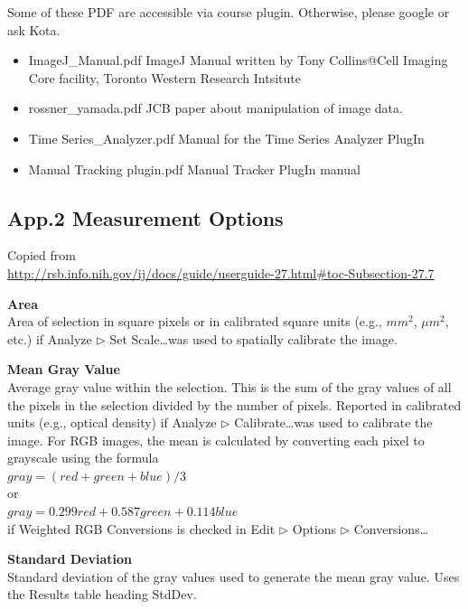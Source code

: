 Some of these PDF are accessible via course plugin. Otherwise, please google or ask Kota. 
\begin{itemize}
\item ImageJ\_Manual.pdf 
\subitem ImageJ Manual written by Tony Collins@Cell Imaging Core facility,
Toronto Western Research Intsitute

\item rossner\_yamada.pdf
\subitem JCB paper about manipulation of image data.

\item Time Series\_Analyzer.pdf
\subitem Manual for the Time Series Analyzer PlugIn 

\item Manual Tracking plugin.pdf
\subitem Manual Tracker PlugIn manual
\end{itemize}


\clearpage
\subsection{App.2 Measurement Options}
\label{app2}
Copied from\\
\url{http://rsb.info.nih.gov/ij/docs/guide/userguide-27.html\#toc-Subsection-27.7}

\textbf{Area}\\Area of selection in square pixels or in calibrated
square units (e.g., $mm^2$, $\mu m^{2}$, etc.) if Analyze
${\triangleright}$ Set Scale\ldots was used to spatially calibrate the
image.

\textbf{Mean Gray Value}\\Average gray value within the selection.
This is the sum of the gray values of all the pixels in the selection
divided by the number of pixels. Reported in calibrated units (e.g.,
optical density) if Analyze ${\triangleright}$ Calibrate\ldots was
used to calibrate the image. For RGB images, the mean is calculated by
converting each pixel to grayscale using the formula\\
$gray=(red+green+blue)/3$\\
or\\
$gray=0.299 red + 0.587 green + 0.114 blue$\\
if Weighted RGB Conversions is checked in Edit ${\triangleright}$
Options ${\triangleright}$ Conversions\ldots




\textbf{Standard Deviation}\\Standard deviation of the gray values
used to generate the mean gray value. Uses the Results table heading
StdDev.

